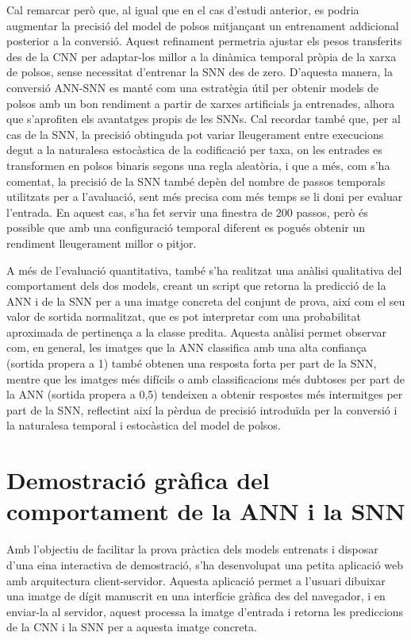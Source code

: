 \documentclass[a4paper,11pt, titlepage, twoside]{article}
\begin{document}
Cal remarcar però que, al igual que en el cas d'estudi anterior, es podria augmentar la precisió del model de polsos mitjançant un entrenament addicional posterior a la conversió. Aquest refinament permetria ajustar els pesos transferits des de la CNN per adaptar-los millor a la dinàmica temporal pròpia de la xarxa de polsos, sense necessitat d'entrenar la SNN des de zero. D'aquesta manera, la conversió ANN-SNN es manté com una estratègia útil per obtenir models de polsos amb un bon rendiment a partir de xarxes artificials ja entrenades, alhora que s'aprofiten els avantatges propis de les SNNs.
Cal recordar també que, per al cas de la SNN, la precisió obtinguda pot variar lleugerament entre execucions degut a la naturalesa estocàstica de la codificació per taxa, on les entrades es transformen en polsos binaris segons una regla aleatòria, i que a més, com s'ha comentat, la precisió de la SNN també depèn del nombre de passos temporals utilitzats per a l'avaluació, sent més precisa com més temps se li doni per evaluar l'entrada. En aquest cas, s'ha fet servir una finestra de 200 passos, però és possible que amb una configuració temporal diferent es pogués obtenir un rendiment lleugerament millor o pitjor.

A més de l'evaluació quantitativa, també s'ha realitzat una anàlisi qualitativa del comportament dels dos models, creant un script que retorna la predicció de la ANN i de la SNN per a una imatge concreta del conjunt de prova, així com el seu valor de sortida normalitzat, que es pot interpretar com una probabilitat aproximada de pertinença a la classe predita. Aquesta anàlisi permet observar com, en general, les imatges que la ANN classifica amb una alta confiança (sortida propera a 1) també obtenen una resposta forta per part de la SNN, mentre que les imatges més difícils o amb classificacions més dubtoses per part de la ANN (sortida propera a 0,5) tendeixen a obtenir respostes més intermitges per part de la SNN, reflectint així la pèrdua de precisió introduïda per la conversió i la naturalesa temporal i estocàstica del model de polsos.
\section{Demostració gràfica del comportament de la ANN i la SNN}
Amb l'objectiu de facilitar la prova pràctica dels models entrenats i disposar d'una eina interactiva de demostració, s'ha desenvolupat una petita aplicació web amb arquitectura client-servidor. Aquesta aplicació permet a l'usuari dibuixar una imatge de dígit manuscrit en una interfície gràfica des del navegador, i en enviar-la al servidor, aquest processa la imatge d'entrada i retorna les prediccions de la CNN i la SNN per a aquesta imatge concreta.
\end{document}
